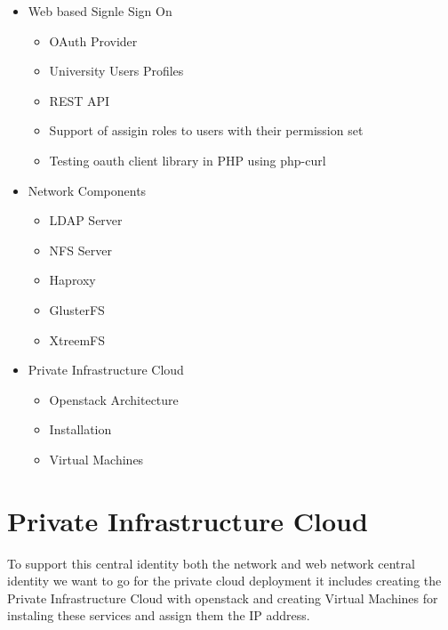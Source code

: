 \documentclass[12pt]{report}
\begin{document}
	\begin{itemize}
		\item Web based Signle Sign On
		\begin{itemize}
			\item OAuth Provider 
			\item University Users Profiles 
			\item REST API 
			\item Support of assigin roles to users with their permission set
			\item Testing oauth client library in PHP using php-curl
		\end{itemize}
		\item Network Components
		\begin{itemize}
			\item LDAP Server
			\item NFS Server
			\item Haproxy
			\item GlusterFS
			\item XtreemFS
		\end{itemize}
		\item Private Infrastructure Cloud
		\begin{itemize}
			\item Openstack Architecture
			\item Installation
			\item Virtual Machines
		\end{itemize}		 			

	\end{itemize}

\chapter{Private Infrastructure Cloud}
To support this central identity both the network and web network central identity we want to go for the private cloud deployment it includes creating the Private Infrastructure Cloud with openstack and creating Virtual Machines for instaling these services and assign them the IP address.
\end{document}
